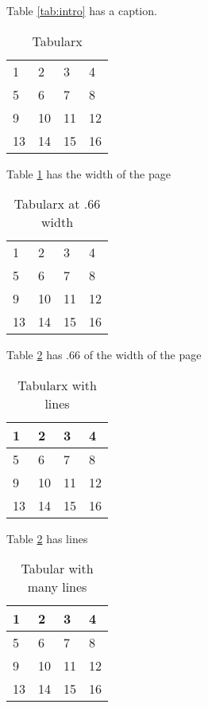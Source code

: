 Table \ref{tab:intro} has a caption.


\begin{table}
\begin{tabularx}{\textwidth}{XXXX}
 1&2&3&4\\
 5&6&7&8\\
 9&10&11&12\\
 13&14&15&16
\end{tabularx}
\caption{Tabularx}
\label{tab:tabularx}
\end{table}

Table \ref{tab:tabularx} has the width of the page

\begin{table}
\begin{tabularx}{.66\textwidth}{XXXX}
 1&2&3&4\\
 5&6&7&8\\
 9&10&11&12\\
 13&14&15&16
\end{tabularx}
\caption{Tabularx at .66 width}
\label{tab:tabularx66}
\end{table}

Table \ref{tab:tabularx66} has .66 of the width of the page



\begin{table}
\begin{tabularx}{\textwidth}{XXXX}
\toprule
 1&2&3&4\\
 \midrule 
 5&6&7&8\\
 9&10&11&12\\
 13&14&15&16\\
 \bottomrule
\end{tabularx}
\caption{Tabularx with lines}
\label{tab:tabularxrules}
\end{table}

Table \ref{tab:tabularx66} has lines



\begin{table}
\begin{tabularx}{\textwidth}{XXXX}
\hline
 1&2&3&4\\
\hline
 5&6&7&8\\
\hline
 9&10&11&12\\
\hline
 13&14&15&16\\
 \hline
\end{tabularx}
\caption{Tabular with many lines}
\label{tab:tabularxhline}
\end{table}



